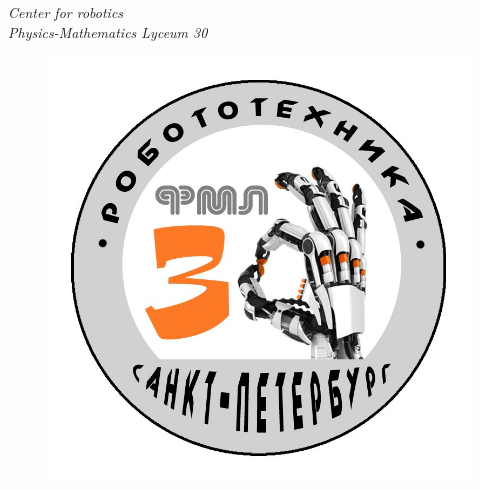 \thispagestyle{titlestyle}
\begin{titlepage}
	
	\begin{center}
		\LARGE\textit{Center for robotics \\ Physics-Mathematics Lyceum 30}
		\begin{figure}[H]
			\begin{minipage}[h]{0.47\linewidth}
			\end{minipage}
			\hfill
			\begin{minipage}{0.47\linewidth}
				\includegraphics[scale=0.15]{0Title/images/02}
			\end{minipage}
		\end{figure}
		\vspace{3em}
		

\end{center}
\end{titlepage}
